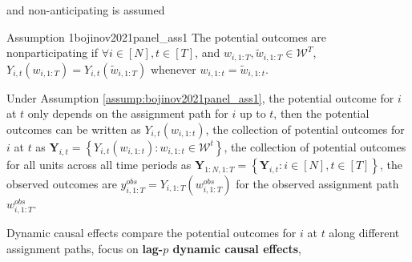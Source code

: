 \documentclass[twoside]{article}
\begin{document}
and non-anticipating is assumed 
\begin{assumption}{\citet{bojinov2021panel} Assumption 1}{bojinov2021panel_ass1}
   The potential outcomes are nonparticipating if $\forall i \in [N],t\in [T]$, and $w_{i,1:T},\tilde{w}_{i,1:T}\in \mathcal{W}^T$, $Y_{i,t}(w_{i,1:T})= Y_{i,t}(\tilde{w}_{i,1:T})$ whenever $w_{i,1:t} = \tilde{w}_{i,1:t}$.  
\end{assumption}
Under Assumption \ref{assump:bojinov2021panel_ass1}, the potential outcome for $i$ at $t$ only depends on the assignment path for $i$ up to $t$, then the potential outcomes can be written as $Y_{i,t}(w_{i,1:t})$, the collection of potential outcomes for $i$ at $t$ as $\mathbf{Y}_{i,t}=\left\{Y_{i,t}(w_{i,1:t}):w_{i,1:t}\in \mathcal{W}^t\right\}$, the collection of potential outcomes for all units across all time periods as $\mathbf{Y}_{1:N,1:T} = \left\{\mathbf{Y}_{i,t}:i\in [N],t\in [T]\right\}$, the observed outcomes are $y_{i,1:T}^{obs} = Y_{i,1:T}\left(w^{obs}_{i,1:T}\right)$ for the observed assignment path $w^{obs}_{i,1:T}$.

Dynamic causal effects compare the potential outcomes for $i$ at $t$ along different assignment paths, \citet{bojinov2021panel} focus on \textbf{lag-$p$ dynamic causal effects},
\end{document}
